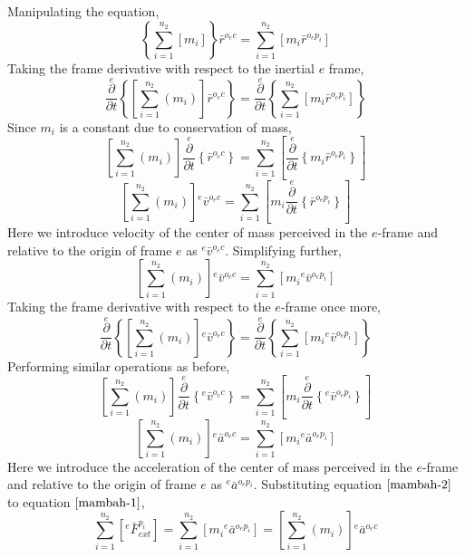 Manipulating the equation,
$$\left\{\sum^{n_{2}}_{i = 1}\left[m_{i}\right]\right\}\bar{r}^{o_{e}c} = \sum^{n_{2}}_{i = 1}\left[m_{i}\bar{r}^{o_{e}p_{i}}\right]$$
Taking the frame derivative with respect to the inertial $e$ frame,
$$\overset{e}{\frac{\partial}{\partial t}}\left\{\left[\displaystyle \sum^{n_{2}}_{i = 1}\left(m_{i}\right)\right]\bar{r}^{o_{e}c}\right\} = \overset{e}{\frac{\partial}{\partial t}}\left\{\sum^{n_{2}}_{i = 1}\left[m_{i}\bar{r}^{o_{e}p_{i}}\right]\right\}$$
Since $m_{i}$ is a constant due to conservation of mass,
$$\left[\displaystyle \sum^{n_{2}}_{i = 1}\left(m_{i}\right)\right]\overset{e}{\frac{\partial}{\partial t}}\left\{\bar{r}^{o_{e}c}\right\} = \sum^{n_{2}}_{i = 1}\left[\overset{e}{\frac{\partial}{\partial t}}\left\{m_{i}\bar{r}^{o_{e}p_{i}}\right\}\right]$$
\begin{equation}
\left[ \sum^{n_{2}}_{i = 1}\left(m_{i}\right)\right]{}^{e}\bar{v}^{o_{e}c} = \sum^{n_{2}}_{i = 1}\left[m_{i}\overset{e}{\frac{\partial}{\partial t}}\left\{\bar{r}^{o_{e}p_{i}}\right\}\right]
\label{velocity shorthand notation Newtons second law rigid body}
\end{equation}
Here we introduce velocity of the center of mass perceived in the $e$-frame and relative to the origin of frame $e$ as ${}^{e}\bar{v}^{o_{e}c}$. 
Simplifying further,
$$\left[\sum^{n_{2}}_{i = 1}\left(m_{i}\right)\right]{}^{e}\bar{v}^{o_{e}c} = \sum^{n_{2}}_{i = 1}\left[m_{i}{}^{e}\bar{v}^{o_{e}p_{i}}\right]$$
Taking the frame derivative with respect to the $e$-frame once more,
$$\overset{e}{\frac{\partial}{\partial t}}\left\{\left[\sum^{n_{2}}_{i = 1}\left(m_{i}\right)\right]{}^{e}\bar{v}^{o_{e}c}\right\} = \overset{e}{\frac{\partial}{\partial t}}\left\{\sum^{n_{2}}_{i = 1}\left[m_{i}{}^{e}\bar{v}^{o_{e}p_{i}}\right]\right\}$$
Performing similar operations as before,
$$\left[\sum^{n_{2}}_{i = 1}\left(m_{i}\right)\right]\overset{e}{\frac{\partial}{\partial t}}\left\{{}^{e}\bar{v}^{o_{e}c}\right\} = \sum^{n_{2}}_{i = 1}\left[m_{i}\overset{e}{\frac{\partial}{\partial t}}\left\{{}^{e}\bar{v}^{o_{e}p_{i}}\right\}\right]$$
\begin{equation}\left[\sum^{n_{2}}_{i = 1}\left(m_{i}\right)\right]{}^{e}\bar{a}^{o_{e}c} = \sum^{n_{2}}_{i = 1}\left[m_{i}{}^{e}\bar{a}^{o_{e}p_{i}}\right]\label{mambah-2}\end{equation}
Here we introduce the acceleration of the center of mass perceived in the $e$-frame and relative to the origin of frame $e$ as ${}^{e}\bar{a}^{o_{e}p_{i}}$. 
Substituting equation $\ref{mambah-2}$ to equation $\ref{mambah-1}$,
$$\sum^{n_{2}}_{i = 1}\left[{}^{e}\bar{F}^{p_{i}}_{ext}\right] = \sum^{n_{2}}_{i = 1}\left[m_{i}{}^{e}\bar{a}^{o_{e}p_{i}}\right] = \left[\sum^{n_{2}}_{i = 1}\left(m_{i}\right)\right]{}^{e}\bar{a}^{o_{e}c}$$
